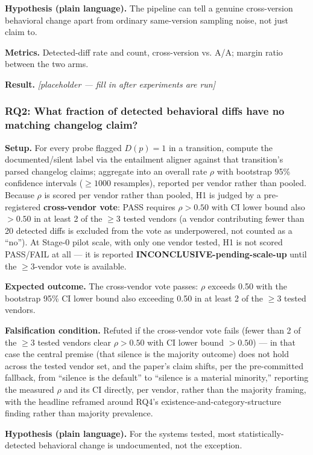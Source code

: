 \documentclass[11pt]{article}
\newcommand{\ph}{\textit{[placeholder --- fill in after experiments are run]}}
\begin{document}
\textbf{Hypothesis (plain language).} The pipeline can tell a genuine cross-version behavioral change apart from ordinary same-version sampling noise, not just claim to.

\textbf{Metrics.} Detected-diff rate and count, cross-version vs. A/A; margin ratio between the two arms.

\textbf{Result.} \ph

\subsubsection{RQ2: What fraction of detected behavioral diffs have no matching changelog claim?}
\textbf{Setup.} For every probe flagged $D(p)=1$ in a transition, compute the documented/silent label via the entailment aligner against that transition's parsed changelog claims; aggregate into an overall rate $\rho$ with bootstrap 95\% confidence intervals ($\geq 1000$ resamples), reported per vendor rather than pooled. Because $\rho$ is scored per vendor rather than pooled, H1 is judged by a pre-registered \textbf{cross-vendor vote}: PASS requires $\rho>0.50$ with CI lower bound also $>0.50$ in at least 2 of the $\geq3$ tested vendors (a vendor contributing fewer than 20 detected diffs is excluded from the vote as underpowered, not counted as a ``no''). At Stage-0 pilot scale, with only one vendor tested, H1 is not scored PASS/FAIL at all --- it is reported \textbf{INCONCLUSIVE-pending-scale-up} until the $\geq3$-vendor vote is available.

\textbf{Expected outcome.} The cross-vendor vote passes: $\rho$ exceeds 0.50 with the bootstrap 95\% CI lower bound also exceeding 0.50 in at least 2 of the $\geq3$ tested vendors.

\textbf{Falsification condition.} Refuted if the cross-vendor vote fails (fewer than 2 of the $\geq3$ tested vendors clear $\rho>0.50$ with CI lower bound $>0.50$) --- in that case the central premise (that silence is the majority outcome) does not hold across the tested vendor set, and the paper's claim shifts, per the pre-committed fallback, from ``silence is the default'' to ``silence is a material minority,'' reporting the measured $\rho$ and its CI directly, per vendor, rather than the majority framing, with the headline reframed around RQ4's existence-and-category-structure finding rather than majority prevalence.

\textbf{Hypothesis (plain language).} For the systems tested, most statistically-detected behavioral change is undocumented, not the exception.
\end{document}
